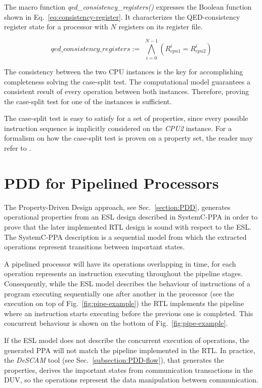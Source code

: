 The macro function \textit{qed\_consistency\_registers()} expresses the Boolean function shown in Eq.~\ref{eq:consistency-register}. It characterizes the QED-consistency register state for a processor with $N$ registers on its register file.

\begin{equation}
    qed\_consistency\_registers := \,\, \bigwedge_{i = 0}^{N-1} \left(R^i_{cpu1} = R^i_{cpu2}\right)
    \label{eq:consistency-register}
\end{equation}

The consistency between the two CPU instances is the key for accomplishing completeness solving the case-split test. The \SSQED{} computational model guarantees a consistent result of every operation between both instances. Therefore, proving the case-split test for one of the instances is sufficient.

The case-split test is easy to satisfy for a set of \SSQED{} properties, since every possible instruction sequence is implicitly considered on the \textit{CPU2} instance. For a formalism on how the case-split test is proven on a \SSQED{} property set, the reader may refer to \cite{paper-gapfree}.

\section{PDD for Pipelined Processors}
\label{section:pdd-pipe-processor}

The Property-Driven Design approach, see Sec.~\ref{section:PDD}, generates operational properties from an ESL design described in SystemC-PPA in order to prove that the later implemented RTL design is sound with respect to the ESL. The SystemC-PPA description is a sequential model from which the extracted operations represent transitions between important states. 

A pipelined processor will have its operations overlapping in time, for each operation represents an instruction executing throughout the pipeline stages. Consequently, while the ESL model describes the behaviour of instructions of a program executing sequentially one after another in the processor (see the execution on top of Fig.~\ref{fig:pipe-example}) the RTL implements the pipeline where an instruction starts executing before the previous one is completed. This concurrent behaviour is shown on the bottom of Fig.~\ref{fig:pipe-example}.

If the ESL model does not describe the concurrent execution of operations, the generated PPA will not match the pipeline implemented in the RTL. In practice, the \textit{DeSCAM} tool (see Sec.~\ref{subsection:PDD-flow}), that generates the properties, derives the important states from communication transactions in the DUV, so the operations represent the data manipulation between communication. 

